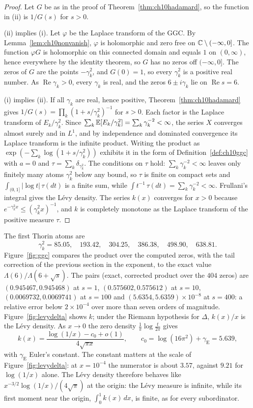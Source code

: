 \begin{proof}
Let $G$ be as in the proof of Theorem~\ref{thm:ch10hadamard}, so the function in (ii) is $1/G(s)$ for $s>0$.

(ii) implies (i). Let $\varphi$ be the Laplace transform of the GGC. By Lemma~\ref{lem:ch10nonvanish}, $\varphi$ is holomorphic and zero free on $\mathbb{C}\setminus(-\infty,0]$. The function $\varphi G$ is holomorphic on this connected domain and equals $1$ on $(0,\infty)$, hence everywhere by the identity theorem, so $G$ has no zeros off $(-\infty,0]$. The zeros of $G$ are the points $-\gamma_k^2$, and $G(0) = 1$, so every $\gamma_k^2$ is a positive real number. As $\operatorname{Re}\gamma_k>0$, every $\gamma_k$ is real, and the zeros $6\pm i\gamma_k$ lie on $\operatorname{Re}s=6$.

(i) implies (ii). If all $\gamma_k$ are real, hence positive, Theorem~\ref{thm:ch10hadamard} gives $1/G(s) = \prod_k(1+s/\gamma_k^2)^{-1}$ for $s>0$. Each factor is the Laplace transform of $E_k/\gamma_k^2$. Since $\sum_k\mathbb{E}[E_k/\gamma_k^2] = \sum_k\gamma_k^{-2}<\infty$, the series $X$ converges almost surely and in $L^1$, and by independence and dominated convergence its Laplace transform is the infinite product. Writing the product as $\exp(-\sum_k\log(1+s/\gamma_k^2))$ exhibits it in the form of Definition~\ref{def:ch10ggc} with $a = 0$ and $\tau = \sum_k\delta_{\gamma_k^2}$. The conditions on $\tau$ hold: $\sum_k\gamma_k^{-2}<\infty$ leaves only finitely many atoms $\gamma_k^2$ below any bound, so $\tau$ is finite on compact sets and $\int_{(0,1]}|\log t|\,\tau(dt)$ is a finite sum, while $\int t^{-1}\,\tau(dt) = \sum_k\gamma_k^{-2}<\infty$. Frullani's integral gives the L\'evy density. The series $k(x)$ converges for $x>0$ because $e^{-\gamma_k^2x}\le(\gamma_k^2x)^{-1}$, and $k$ is completely monotone as the Laplace transform of the positive measure $\tau$.
\end{proof}

The first Thorin atoms are
\[
\gamma_k^2 = 85.05,\quad 193.42,\quad 304.25,\quad 386.38,\quad 498.90,\quad 638.81 .
\] Figure~\ref{fig:ggc} compares the product over the computed zeros, with the tail correction of the previous section in the exponent, to the exact value $\Lambda(6)/\Lambda(6+\sqrt s)$. The pairs (exact, corrected product over the $404$ zeros) are $(0.945467, 0.945468)$ at $s=1$, $(0.575602, 0.575612)$ at $s=10$, $(0.0069732, 0.0069741)$ at $s=100$ and $(5.6354, 5.6359)\times10^{-8}$ at $s=400$: a relative error below $2\times10^{-4}$ over more than seven orders of magnitude. Figure~\ref{fig:levydelta} shows $k$; under the Riemann hypothesis for $\Delta$, $k(x)/x$ is the L\'evy density. As $x\to0$ the zero density $\frac1\pi\log\frac{t}{2\pi}$ gives
\[
k(x) = \frac{\log(1/x)-c_0+o(1)}{4\sqrt{\pi x}},\qquad c_0 = \log(16\pi^2)+\gamma_{\mathrm E} = 5.639,
\]
with $\gamma_{\mathrm E}$ Euler's constant. The constant matters at the scale of Figure~\ref{fig:levydelta}: at $x=10^{-4}$ the numerator is about $3.57$, against $9.21$ for $\log(1/x)$ alone. The L\'evy density therefore behaves like $x^{-3/2}\log(1/x)/(4\sqrt\pi)$ at the origin: the L\'evy measure is infinite, while its first moment near the origin, $\int_0^1k(x)\,dx$, is finite, as for every subordinator.



